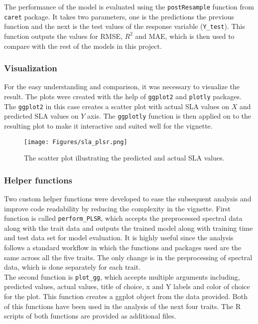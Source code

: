 \documentclass[12pt,a4paper]{report}
\begin{document}
The performance of the model is evaluated using the \texttt{postResample} function from \texttt{caret} package. It takes two parameters, one is the predictions the previous function and the next is the test values of the response variable (\texttt{Y\_test}). This function outputs the values for RMSE, $R^2$ and MAE, which is then used to compare with the rest of the models in this project.

\subsubsection*{Visualization}
For the easy understanding and comparison, it was necessary to visualize the result. The plots were created with the help of \texttt{ggplot2} and \texttt{plotly} packages. The \texttt{ggplot2} in this case creates a scatter plot with actual SLA values on $X$ and predicted SLA values on $Y$ axis. The \texttt{ggplotly} function is then applied on to the resulting plot to make it interactive and suited well for the vignette.

\begin{figure}[h]
    \centering
    \texttt{[image: Figures/sla\_plsr.png]}
    \caption{The scatter plot illustrating the predicted and actual SLA values.}
    \label{fig:sla_plsr}
\end{figure}

\subsubsection*{Helper functions}
Two custom helper functions were developed to ease the subsequent analysis and improve code readability by reducing the complexity in the vignette. First function is called \texttt{perform\_PLSR}, which accepts the preprocessed spectral data along with the trait data and outputs the trained model along with training time and test data set for model evaluation. It is highly useful since the analysis follows a standard workflow in which the functions and packages used are the same across all the five traits. The only change is in the preprocessing of spectral data, which is done separately for each trait.\\

The second function is \texttt{plot\_gg}, which accepts multiple arguments including, predicted values, actual values, title of choice, x and Y labels and color of choice for the plot. This function creates a ggplot object from the data provided. Both of this functions have been used in the analysis of the next four traits. The R scripts of both functions are provided as additional files. \\
\end{document}
